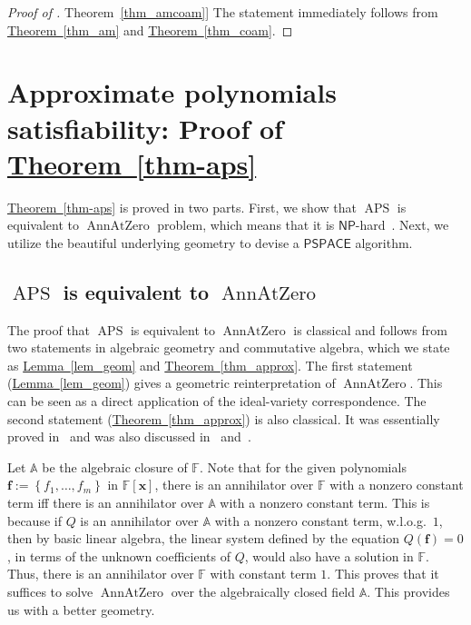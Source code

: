 \documentclass[11pt]{article}
\numberwithin{equation}{section}
\theoremstyle{definition}
\theoremstyle{plain}
\newcommand{\cclass}[1]{\textsf{#1}}
\newcommand{\expref}[2]{\hyperref[#2]{#1~\ref{#2}}}
\newcommand{\F}{\mathbb{F}}
\newcommand{\aff}{\mathbb{A}}
\newcommand{\inbrace }[1]{\left\{#1\right\}}
\newcommand{\NP}{\cclass{NP}\xspace}  %
\newcommand{\PSPACE}{\cclass{PSPACE}\xspace}  %
\DeclareMathOperator{\APS}{\mathrm{APS}\xspace} %
\DeclareMathOperator{\AnnAtZero}{\mathrm{AnnAtZero}\xspace} %
\begin{document}
\begin{proof}[Proof of \expref{Theorem}{thm_amcoam}]
The statement immediately follows from \expref{Theorem}{thm_am} and \expref{Theorem}{thm_coam}.
\end{proof}


%

\section{Approximate polynomials satisfiability: Proof of \expref{Theorem}{thm-aps}} \label{sec:aps}
%

\expref{Theorem}{thm-aps} is proved in two parts. First, we show that $\APS$ is equivalent to $\AnnAtZero$ 
%
problem, %
which means that it is $\NP$-hard~\cite{Kay09}. Next, we utilize the  beautiful underlying geometry to devise a $\PSPACE$ algorithm.


\subsection{\texorpdfstring{$\APS$}{APS} is equivalent to \texorpdfstring{$\AnnAtZero$}{AnnAtZero}}

The proof that $\APS$ is equivalent to $\AnnAtZero$ is classical and follows from two statements in algebraic geometry and commutative algebra, which we state as \expref{Lemma}{lem_geom} and \expref{Theorem}{thm_approx}.
The first statement (\expref{Lemma}{lem_geom}) gives a geometric reinterpretation of $\AnnAtZero$. This can be seen as a direct application of the ideal-variety correspondence. 
The second statement (\expref{Theorem}{thm_approx})  is also classical. It was essentially proved in~\cite{LL89} and was also discussed in~\cite[Lemma~20.28]{burgisser2013algebraic} and~\cite[Page~37:53]{grochow2018circuit}.

%

Let $\aff$ be the algebraic closure of $\F$. Note that for the given polynomials $\mathbf f:= \inbrace{f_1,\dots,f_m}$ in $\F[\mathbf x]$, there is an annihilator over $\F$ with 
%
a nonzero %
constant term iff there is an annihilator over $\aff$ with 
%
a nonzero %
constant term. This is because if $Q$ is an annihilator over $\aff$ with 
%
a nonzero %
constant term, w.l.o.g.\ $1$, then by basic linear algebra, the linear system defined by the equation $Q(\mathbf f)=0$, in terms of the unknown coefficients of $Q$, would also have a solution in $\F$. Thus, there is an annihilator over $\F$ with constant term $1$. This proves that it suffices to solve $\AnnAtZero$ over the algebraically closed field $\aff$. This provides us with a better geometry. 
\end{document}
